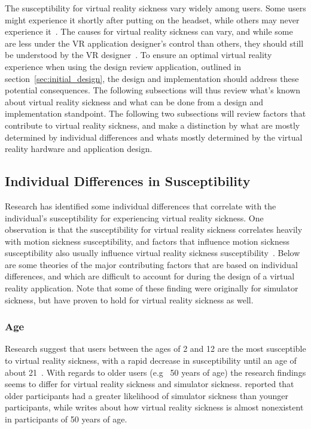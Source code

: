 
The susceptibility for virtual reality sickness vary widely among users. Some users might experience it shortly after putting on the headset, 
while others may never experience it~\citep{Stanney2003}.
The causes for virtual reality sickness can vary, and while some are less under the VR application designer's control than others, 
they should still be understood by the VR designer~\citep{Stanney2003}. 
To ensure an optimal virtual reality experience when using the design review application, outlined in section~\vref{sec:initial_design}, 
the design and implementation should address these potential consequences. 
The following subsections will thus review what's known about virtual reality sickness and what can be done from a design and implementation standpoint.
The following two subsections will review factors that contribute to virtual reality sickness, and make a distinction by
what are mostly determined by individual differences and whats mostly determined by the virtual reality hardware and application design. 

\subsection{Individual Differences in Susceptibility}
Research has identified some individual differences that correlate with the individual's susceptibility for experiencing virtual reality sickness. 
One observation is that the susceptibility for virtual reality sickness correlates heavily with motion sickness susceptibility, and 
factors that influence motion sickness susceptibility also usually influence virtual reality sickness susceptibility~\citep{Stanney2003}.
Below are some theories of the major contributing factors that are based on individual differences, 
and which are difficult to account for during the design of a virtual reality application. 
Note that some of these finding were originally for simulator sickness, but have proven to hold for virtual reality sickness as well.

\subsubsection{Age}
Research suggest that users between the ages of 2 and 12 are the most susceptible to virtual reality sickness, with a rapid decrease in susceptibility 
until an age of about 21~\citep{Kolasinski1995}. With regards to older users (e.g~ 50 years of age) the research findings seems to differ for virtual reality sickness
and simulator sickness. \citet{Brooks2010} reported that older participants had a greater likelihood of simulator sickness than younger participants, while
\citet{Jr2000} writes about how virtual reality sickness is almost nonexistent in participants of 50 years of age. 


